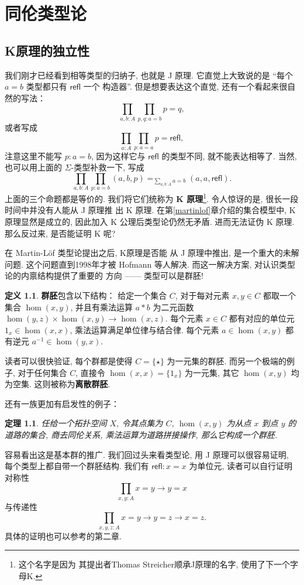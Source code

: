 \documentclass[UTF8]{ctexbook}
\newcommand{\cons}[1]{\textsf{#1}}
\theoremstyle{plain}
\newtheorem{theorem}{定理}[chapter]
\theoremstyle{definition}
\newtheorem{definition}{定义}[chapter]
\theoremstyle{remark}
\begin{document}
\chapter{同伦类型论}
\section{K原理的独立性}
我们刚才已经看到相等类型的归纳子, 也就是 J 原理. 它直觉上大致说的是
“每个 \(a = b\) 类型都只有 \(\cons{refl}\) 一个
构造器”. 但是想要表达这个直觉, 还有一个看起来很自然的写法：
\[\prod_{a,b : A} \prod_{p,q : a = b} p = q,\]
或者写成
\[\prod_{a : A} \prod_{p : a = a} p = \cons{refl},\]
注意这里不能写 \(p : a = b\), 因为这样它与
\(\cons{refl}\) 的类型不同, 就不能表达相等了.
当然, 也可以用上面的 \(\Sigma\)-类型补救一下, 写成
\[\prod_{a,b : A} \prod_{p: a = b} (a,b,p) =_{\sum_{a,b : A}a = b} (a,a,\cons{refl}).\]
上面的三个命题都是等价的. 我们将它们统称为
\textbf{K 原理}\footnote{这个名字是因为
其提出者Thomas Streicher顺承J原理的名字, 使用了下一个字母K.\cite{streicher:1993:K}}.
令人惊讶的是, 很长一段时间中并没有人能从 J 原理推
出 K 原理. 在第\ref{martinlof}章介绍的集合模型中,
K 原理显然是成立的, 因此加入 K 公理后类型论仍然无矛盾.
进而无法证伪 K 原理. 那么反过来, 是否能证明 K 呢?

在 Martin-L\"of 类型论提出之后, K原理是否能
从 J 原理中推出, 是一个重大的未解问题.
这个问题直到1998年才被 Hofmann 等人解决\cite{hofmann:1998:groupoid}.
而这一解决方案, 对认识类型论的内禀结构提供了重要的
方向 ------ 类型可以是群胚!

\begin{definition}
\textbf{群胚}包含以下结构：
给定一个集合 \(C\), 对于每对元素 \(x,y\in C\)
都取一个集合 \(\hom(x,y)\), 并且有乘法运算
\(a * b\) 为二元函数 \(\hom(y,z) \times \hom(x,y) \to \hom(x,z)\).
每个元素 \(x \in C\) 都有对应的单位元
\(1_x \in \hom(x,x)\), 乘法运算满足单位律与结合律.
每个元素 \(a \in \hom(x,y)\) 都有逆元
\(a^{-1} \in \hom(y,x)\).
\end{definition}
读者可以很快验证, 每个群都是使得 \(C = \{\star\}\)
为一元集的群胚. 而另一个极端的例子, 对于任何集合 \(C\),
直接令 \(\hom(x,x) = \{1_x\}\) 为一元集, 其它 \(\hom(x,y)\)
均为空集. 这则被称为\textbf{离散群胚}.

还有一族更加有启发性的例子：
\begin{theorem}
任给一个拓扑空间 \(X\), 令其点集为
\(C\), \(\hom(x,y)\) 为从点 \(x\) 到点
\(y\) 的道路的集合, 商去同伦关系,
乘法运算为道路拼接操作, 那么它构成一个群胚.
\end{theorem}
容易看出这是基本群的推广. 我们回过头来看类型论,
用 J 原理可以很容易证明, 每个类型上都自带一个群胚结构.
我们有 \(\cons{refl} : x = x\) 为单位元,
读者可以自行证明对称性
\[\prod_{x, y : A} x = y \to y = x\]
与传递性
\[\prod_{x,y,z : A} x = y \to y = z \to x = z.\]
具体的证明也可以参考\cite{ufp:2013:hottbook}的第二章.
\end{document}
